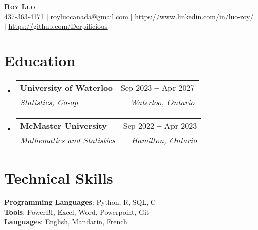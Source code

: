 \documentclass[letterpaper,11pt]{article}
\makeatletter
\newcommand{\resumeSubheading}[4]{
  \vspace{-2pt}\item
    \begin{tabular*}{0.97\textwidth}[t]{l@{\extracolsep{\fill}}r}
      \textbf{#1} & #2 \\
      \textit{\small#3} & \textit{\small #4} \\
    \end{tabular*}\vspace{-7pt}
}
\newcommand{\resumeSubHeadingListStart}{\begin{itemize}[leftmargin=0.15in, label={}]}
\newcommand{\resumeSubHeadingListEnd}{\end{itemize}}
\makeatother
\begin{document}

\begin{center}
    \textbf{\Huge \scshape Roy Luo} \\ \vspace{1pt}
    \small 437-363-4171 $|$ \href{mailto:royluocanada@gmail.com}{\underline{royluocanada@gmail.com}} $|$ 
    \href{https://linkedin.com/in/luo-roy/}{\underline{https://www.linkedin.com/in/luo-roy/}} $|$
    \href{https://github.com/Derpilicious}{\underline{https://github.com/Derpilicious}}
\end{center}
 
\section{Education}
  \resumeSubHeadingListStart
    \resumeSubheading
      {University of Waterloo}{Sep 2023 \textbf{--} Apr 2027}
      {Statistics, Co-op}{Waterloo, Ontario}
    \resumeSubheading
      {McMaster University}{Sep 2022 \textbf{--} Apr 2023}
      {Mathematics and Statistics}{Hamilton, Ontario}
\resumeSubHeadingListEnd
      
\section{Technical Skills}
\begin{itemize}[leftmargin=0.15in, label={}]
   \small{\item{
    \textbf{Programming Languages}{: Python, R, SQL, C} \\
    \textbf{Tools}{: PowerBI, Excel, Word, Powerpoint, Git} \\
    \textbf{Languages}{: English, Mandarin, French} \\
   }}
 \end{itemize}
\end{document}
